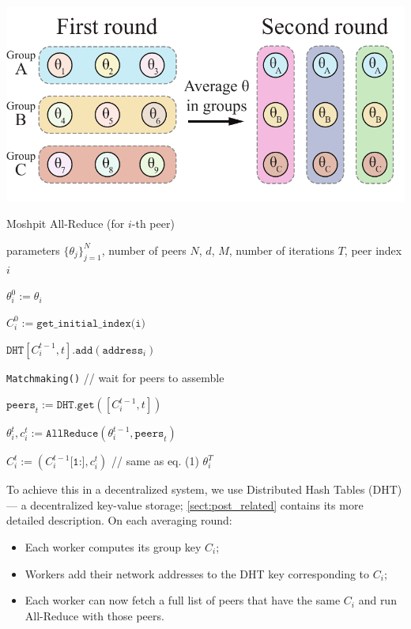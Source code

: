 \vspace{-4pt}
\noindent
\begin{minipage}{0.45\textwidth}
\centering
\includegraphics[width=\textwidth]{resources/moshpit.pdf}
\label{fig:square_allreduce}
\end{minipage}
\begin{minipage}{0.55\textwidth}
\begin{algorithm}[H]
\caption{Moshpit All-Reduce (for $i$-th peer)}
   \label{alg:moshpit}
\begin{algorithmic}[H]
    parameters $\{\theta_j\}_{j=1}^N$, number of peers $N$, $d$, $M$, number of iterations $T$, peer index $i$

   $\theta_{i}^0 := \theta_i$
   
   $C^0_i :=\texttt{get\_initial\_index(i)}$
   
     \STATE $\texttt{DHT}[C^{t-1}_i, t].\texttt{add}(\texttt{address}_i)$
     
     \STATE \texttt{Matchmaking()} // wait for peers to assemble
     
     \STATE $\texttt{peers}_t := \texttt{DHT}.\texttt{get}([C^{t-1}_i, t])$ 
     
     \STATE $\theta_{i}^t, c^t_i := \texttt{AllReduce}(\theta_{i}^{t - 1}, \texttt{peers}_t)$
     
     \STATE $C^t_i := (C^{t-1}_i\texttt{[1:]}, c^t_i)$  // same as eq. (1)
   \ENDFOR
    $\theta^T_i$
\end{algorithmic}
\end{algorithm}
\end{minipage}

To achieve this in a decentralized system, we use Distributed Hash Tables (DHT) --- a decentralized key-value storage; \autoref{sect:post_related} contains its more detailed description. On each averaging round:
\begin{itemize}
    \item Each worker computes its group key $C_i$;
    \item Workers add their network addresses to the DHT key corresponding to $C_i$;
    \item Each worker can now fetch a full list of peers that have the same $C_i$ and run All-Reduce with those peers.
\end{itemize}

